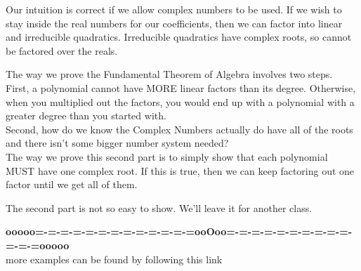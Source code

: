 \documentclass{ximera}
\begin{document}
Our intuition is correct if we allow complex numbers to be used.  If we wish to stay inside the real numbers for our coefficients, then we can factor into linear and irreducible quadratics.  Irreducible quadratics have complex roots, so cannot be factored over the reals.



\begin{idea}


The way we prove the Fundamental Theorem of Algebra involves two steps. \\


First, a polynomial cannot have MORE linear factors than its degree. Otherwise, when you multiplied out the factors, you would end up with a polynomial with a greater degree than you started with.\\


Second, how do we know the Complex Numbers actually do have all of the roots and there isn't some bigger number system needed? \\

The way we prove this second part is to simply show that each polynomial MUST have one complex root. If this is true, then we can keep factoring out one factor until we get all of them.

The second part is not so easy to show.  We'll leave it for another class.


\end{idea}




















\begin{center}
\textbf{\textcolor{green!50!black}{ooooo=-=-=-=-=-=-=-=-=-=-=-=-=ooOoo=-=-=-=-=-=-=-=-=-=-=-=-=ooooo}} \\

more examples can be found by following this link\\ 

\end{center}
\end{document}
